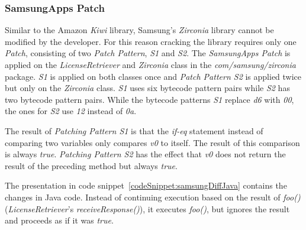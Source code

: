 \subsubsection{SamsungApps Patch}
Similar to the Amazon \textit{Kiwi} library, Samsung's \textit{Zirconia} library cannot be modified by the developer.
For this reason cracking the library requires only one \textit{Patch}, consisting of two \textit{Patch Pattern}, \textit{S1} and \textit{S2}.
The \textit{SamsungApps Patch} is applied on the \textit{LicenseRetriever} and \textit{Zirconia} class in the \textit{com/samsung/zirconia} package.
\textit{S1} is applied on both classes once and \textit{Patch Pattern S2} is applied twice but only on the \textit{Zirconia} class.
\newline
\textit{S1} uses six bytecode pattern pairs while \textit{S2} has two bytecode pattern pairs.
While the bytecode patterns \textit{S1} replace \textit{d6} with \textit{00}, the ones for \textit{S2} use \textit{12} instead of \textit{0a}.
\newline


The result of \textit{Patching Pattern S1} is that the \textit{if-eq} statement instead of comparing two variables only compares \textit{v0} to itself.
The result of this comparison is always \textit{true}.
\newline
\textit{Patching Pattern S2} has the effect that \textit{v0} does not return the result of the preceding method but always \textit{true}.
\newline

The presentation in code snippet~\ref{codeSnippet:samsungDiffJava} contains the changes in Java code.
Instead of continuing execution based on the result of \textit{foo()} (\textit{LicenseRetriever}'s \textit{receiveResponse()}), it executes \textit{foo()}, but ignores the result and proceeds as if it was \textit{true}.
